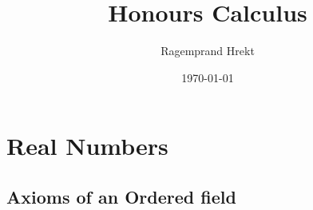 \documentclass[12pt]{book}
\title{Honours Calculus}
\author{Ragemprand Hrekt}
\date{\today}
\theoremstyle{definition}
\begin{document}
\maketitle
\tableofcontents


\chapter{Real Numbers}



\section{Axioms of an Ordered field}
\end{document}
